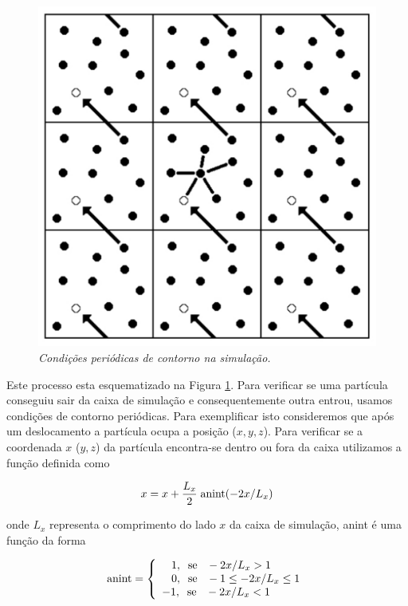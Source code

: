 \documentclass[12pt,twoside,a4paper]{report}
\begin{document}
\begin{figure} [h]
\vspace{0.7cm}
\begin{center}
    \includegraphics[scale=0.3]{contorno}
\end{center}
\caption{\label{condcont} {\sl Condições periódicas de contorno na simulação.}}
\end{figure}

Este 
processo esta
esquematizado na Figura \ref{condcont}.
Para verificar se uma partícula conseguiu sair da caixa de simulação e 
consequentemente outra
entrou, usamos condições de contorno periódicas. Para
exemplificar isto consideremos que após um deslocamento a partícula ocupa
a posição ($x,y,z$). Para verificar se a coordenada $x$ ($y,z$) da partícula
encontra-se dentro ou fora da caixa utilizamos a função definida como

\begin{equation} \label{b1}
x=x+\frac{L_x}{2} \; {\rm anint}(-2x/L_x)
\end{equation}

\noindent onde $L_x$ representa o comprimento do lado $x$ da caixa de
simulação, anint é uma função da forma

\begin{equation}
{\rm anint} = \left\{\begin{array}{l}
    \hspace{0.3cm}  1, \; \; {\rm se} \; \; \;  -2x/L_x > 1  \\
    \hspace{0.3cm}  0, \; \; {\rm se} \; \; \; -1 \le -2x/L_x \le 1 \\
             -1, \; \; {\rm se} \; \; \; -2x/L_x < 1
                     \end{array} \right.
\end{equation}
\end{document}
